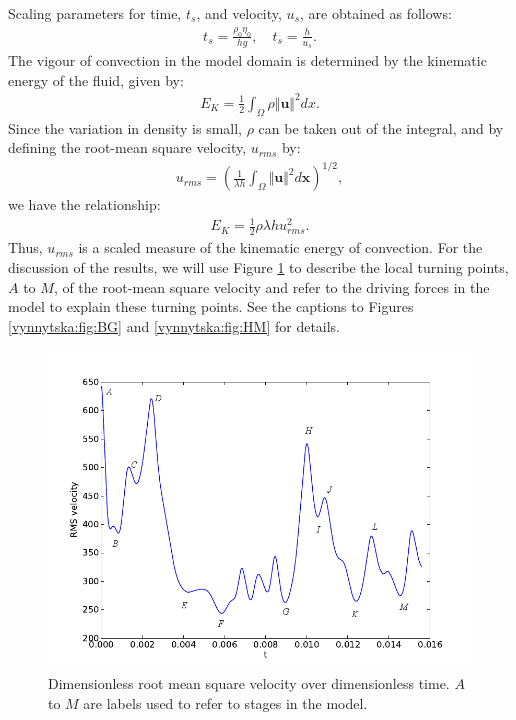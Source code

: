 Scaling parameters for time, $t_s$, and velocity, $u_s$, are obtained
as follows:
\begin{align}
 \label{vynnytska:eq:velsc}
 t_s = \frac{\rho_0 \eta_0}{h g}, \quad t_s = \frac{h}{u_s}.
\end{align}
The vigour of convection in the model domain is determined by the
kinematic energy of the fluid, given by:
\begin{align}
\label{vynnytska:eq:KE}
E_{K} = \frac{1}{2}\int_{\Omega}\rho \Vert \bm{u} \Vert^{2}dx.
\end{align}
Since the variation in density is small, $\rho$ can be taken out of
the integral, and by defining the root-mean square velocity, $u_{rms}$
by:
\begin{align}
\label{vynnytska:eq:u_rms}
u_{rms} =\left( \frac{1}{\lambda h} \int_{\Omega} \Vert \bm{u} \Vert^{2} d\bm{x}  \right)^{1/2},
\end{align}
we have the relationship:
\begin{align}
  \label{vynnytska:eq:KEu_rms}
  E_{K} = \frac{1}{2} \rho \lambda h u_{rms}^{2}.
\end{align}
Thus, $u_{rms}$ is a scaled measure of the kinematic energy of
convection. For the discussion of the results, we will use Figure
\ref{vynnytska:fig:rms_velocity} to describe the local turning points,
$A$ to $M$, of the root-mean square velocity and refer to the driving
forces in the model to explain these turning points. See the captions
to Figures \ref{vynnytska:fig:BG} and \ref{vynnytska:fig:HM} for
details.


\begin{figure}[htbp]
  \begin{center}
   \includegraphics[width=0.95\columnwidth]{chapters/vynnytska/figures/rms_velocity.png}
    \caption{Dimensionless root mean square velocity over
    dimensionless time. $A$ to $M$ are labels used to refer to stages
    in the model.}
  \end{center}
\label{vynnytska:fig:rms_velocity}
\end{figure}


